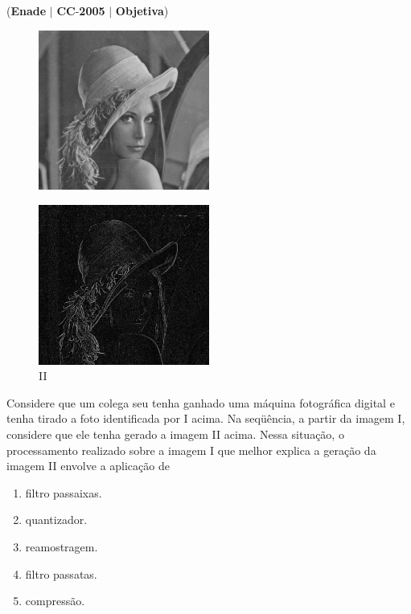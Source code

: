 \documentclass{exam}
\begin{document}
\begin{questions}
\question (\textbf{Enade} $|$ \textbf{CC}-\textbf{2005} $|$ \textbf{Objetiva})

\begin{figure}[H]
	\begin{center}
		\includegraphics[width=0.5\textwidth]{CIENCIA_DA_COMPUTACAO_Prova2005-utf8_figuras/fig-0027.jpg}
	\end{center}
\end{figure}

\begin{figure}[H]
	\begin{center}
		\includegraphics[width=0.5\textwidth]{CIENCIA_DA_COMPUTACAO_Prova2005-utf8_figuras/fig-0028.jpg}
		\caption{II}
	\end{center}
\end{figure}
Considere que um colega seu tenha ganhado uma máquina
fotográfica digital e tenha tirado a foto identificada por I acima.
Na seqüência, a partir da imagem I, considere que ele tenha
gerado a imagem II acima. Nessa situação, o processamento
realizado sobre a imagem I que melhor explica a geração da
imagem II envolve a aplicação de
	\begin{enumerate}[label=\alph*)]
		\item  filtro passaixas.
		\item  quantizador.
		\item  reamostragem.
		\item  filtro passatas.
		\item  compressão.
	\end{enumerate}


\end{questions}
\end{document}
